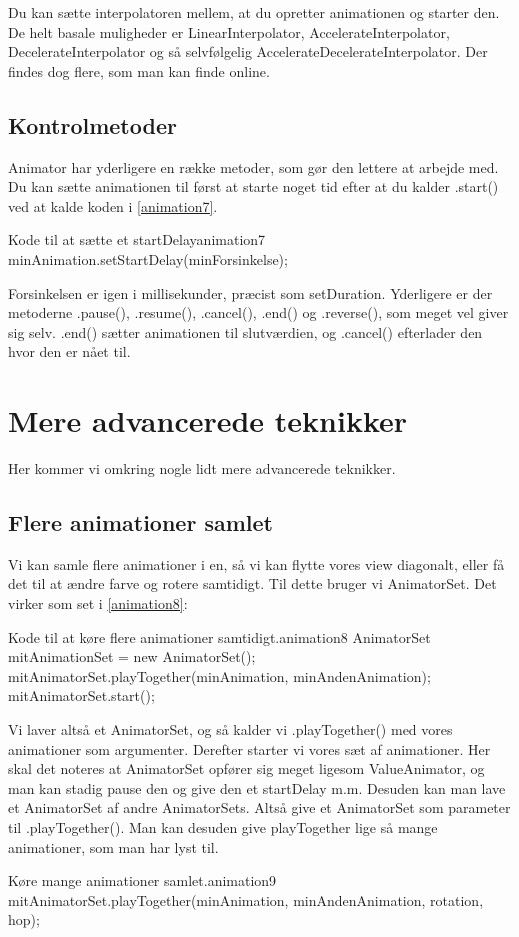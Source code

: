 Du kan sætte interpolatoren mellem, at du opretter animationen og starter den.
De helt basale muligheder er LinearInterpolator, AccelerateInterpolator, DecelerateInterpolator og så selvfølgelig AccelerateDecelerateInterpolator. Der findes dog flere, som man kan finde online.
\subsection{Kontrolmetoder}
Animator har yderligere en række metoder, som gør den lettere at arbejde med. Du kan sætte animationen til først at starte noget tid efter at du kalder .start() ved at kalde koden i \autoref{animation7}. \\
\begin{JavaCode}{Kode til at sætte et startDelay}{animation7}
	minAnimation.setStartDelay(minForsinkelse);
\end{JavaCode}
Forsinkelsen er igen i millisekunder, præcist som setDuration. 
Yderligere er der metoderne .pause(), .resume(), .cancel(),  .end() og .reverse(), som meget vel giver sig selv. .end() sætter animationen til slutværdien, og .cancel() efterlader den hvor den er nået til.
\section{Mere advancerede teknikker}
Her kommer vi omkring nogle lidt mere advancerede teknikker.
\subsection{Flere animationer samlet}
Vi kan samle flere animationer i en, så vi kan flytte vores view diagonalt, eller få det til at ændre farve og rotere samtidigt. Til dette bruger vi AnimatorSet. Det virker som set i \autoref{animation8}:
\begin{JavaCode}{Kode til at køre flere animationer samtidigt.}{animation8}
AnimatorSet mitAnimationSet = new AnimatorSet();
mitAnimatorSet.playTogether(minAnimation, minAndenAnimation);
mitAnimatorSet.start();
\end{JavaCode}
Vi laver altså et AnimatorSet, og så kalder vi .playTogether() med vores animationer som argumenter. Derefter starter vi vores sæt af animationer. Her skal det noteres at AnimatorSet opfører sig meget ligesom ValueAnimator, og man kan stadig pause den og give den et startDelay m.m. 
Desuden kan man lave et AnimatorSet af andre AnimatorSets. Altså give et AnimatorSet som parameter til .playTogether(). Man kan desuden give playTogether lige så mange animationer, som man har lyst til.
\begin{JavaCode}{Køre mange animationer samlet.}{animation9}
	mitAnimatorSet.playTogether(minAnimation, minAndenAnimation, rotation, hop);
\end{JavaCode}

